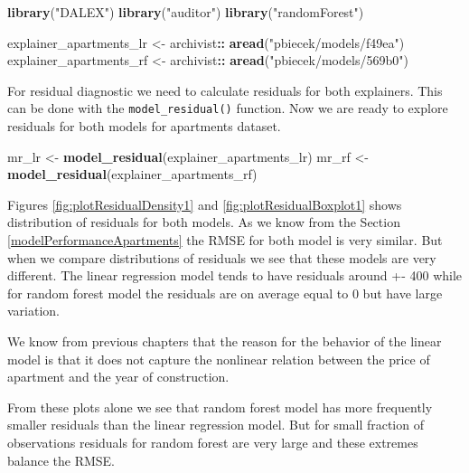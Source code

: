 \documentclass[12pt,]{krantz}
\newenvironment{Shaded}{\begin{snugshade}}{\end{snugshade}}
\newcommand{\KeywordTok}[1]{\textcolor[rgb]{0.13,0.29,0.53}{\textbf{#1}}}
\newcommand{\NormalTok}[1]{#1}
\newcommand{\OperatorTok}[1]{\textcolor[rgb]{0.81,0.36,0.00}{\textbf{#1}}}
\newcommand{\StringTok}[1]{\textcolor[rgb]{0.31,0.60,0.02}{#1}}
\begin{document}
\begin{Shaded}
\begin{Highlighting}[]
\KeywordTok{library}\NormalTok{(}\StringTok{"DALEX"}\NormalTok{)}
\KeywordTok{library}\NormalTok{(}\StringTok{"auditor"}\NormalTok{)}
\KeywordTok{library}\NormalTok{(}\StringTok{"randomForest"}\NormalTok{)}

\NormalTok{explainer_apartments_lr <-}\StringTok{ }\NormalTok{archivist}\OperatorTok{::}\StringTok{ }\KeywordTok{aread}\NormalTok{(}\StringTok{"pbiecek/models/f49ea"}\NormalTok{)}
\NormalTok{explainer_apartments_rf <-}\StringTok{ }\NormalTok{archivist}\OperatorTok{::}\StringTok{ }\KeywordTok{aread}\NormalTok{(}\StringTok{"pbiecek/models/569b0"}\NormalTok{)}
\end{Highlighting}
\end{Shaded}

For residual diagnostic we need to calculate residuals for both explainers. This can be done with the \texttt{model\_residual()} function. Now we are ready to explore residuals for both models for apartments dataset.

\begin{Shaded}
\begin{Highlighting}[]
\NormalTok{mr_lr <-}\StringTok{ }\KeywordTok{model_residual}\NormalTok{(explainer_apartments_lr)}
\NormalTok{mr_rf <-}\StringTok{ }\KeywordTok{model_residual}\NormalTok{(explainer_apartments_rf)}
\end{Highlighting}
\end{Shaded}

Figures \ref{fig:plotResidualDensity1} and \ref{fig:plotResidualBoxplot1} shows distribution of residuals for both models. As we know from the Section \ref{modelPerformanceApartments} the RMSE for both model is very similar. But when we compare distributions of residuals we see that these models are very different. The linear regression model tends to have residuals around +- 400 while for random forest model the residuals are on average equal to 0 but have large variation.

We know from previous chapters that the reason for the behavior of the linear model is that it does not capture the nonlinear relation between the price of apartment and the year of construction.

From these plots alone we see that random forest model has more frequently smaller residuals than the linear regression model. But for small fraction of observations residuals for random forest are very large and these extremes balance the RMSE.
\end{document}
